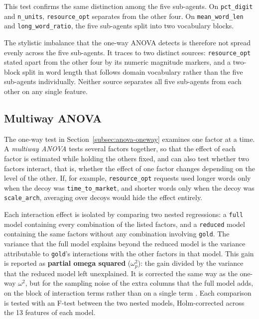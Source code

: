 This test confirms the same distinction among the five sub-agents. On \texttt{pct\_digit} and \texttt{n\_units}, \texttt{resource\_opt} separates from the other four. On \texttt{mean\_word\_len} and \texttt{long\_word\_ratio}, the five sub-agents split into two vocabulary blocks.

The stylistic imbalance that the one-way ANOVA detects is therefore not spread evenly across the five sub-agents. It traces to two distinct sources: \texttt{resource\_opt} stated apart from the other four by its numeric magnitude markers, and a two-block split in word length that follows domain vocabulary rather than the five sub-agents individually. Neither source separates all five sub-agents from each other on any single feature.

\subsection{Multiway ANOVA}
\label{subsec:anova-multiway}

The one-way test in Section~\ref{subsec:anova-oneway} examines one factor at a time. A \emph{multiway ANOVA} tests several factors together, so that the effect of each factor is estimated while holding the others fixed, and can also test whether two factors interact, that is, whether the effect of one factor changes depending on the level of the other. If, for example, \texttt{resource\_opt} requests used longer words only when the decoy was \texttt{time\_to\_market}, and shorter words only when the decoy was \texttt{scale\_arch}, averaging over decoys would hide the effect entirely.

Each interaction effect is isolated by comparing two nested regressions: a \texttt{full} model containing every combination of the listed factors, and a \texttt{reduced} model containing the same factors without any combination involving \texttt{gold}. The variance that the full model explains beyond the reduced model is the variance attributable to \texttt{gold}'s interactions with the other factors in that model. This gain is reported as \textbf{partial omega squared} ($\omega_p^2$): the gain divided by the variance that the reduced model left unexplained. It is corrected the same way as the one-way $\omega^2$, but for the sampling noise of the extra columns that the full model adds, on the block of interaction terms rather than on a single term \citep{olejnikGeneralizedEtaOmega2003}. Each comparison is tested with an F-test between the two nested models, Holm-corrected across the 13 features of each model.

